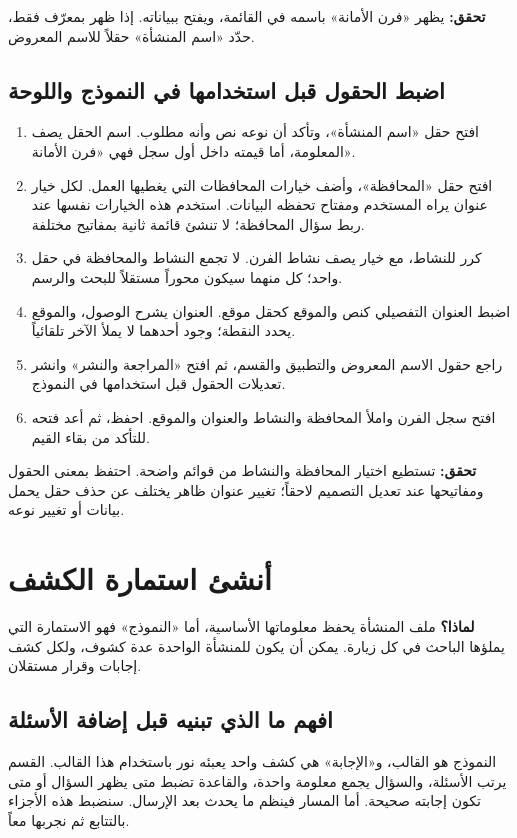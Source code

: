 \textbf{تحقق:} يظهر «فرن الأمانة» باسمه في القائمة، ويفتح ببياناته. إذا ظهر بمعرّف فقط، حدّد «اسم المنشأة» حقلاً للاسم المعروض.

\subsection{اضبط الحقول قبل استخدامها في النموذج واللوحة}

\begin{enumerate}
\item افتح حقل «اسم المنشأة»، وتأكد أن نوعه نص وأنه مطلوب. اسم الحقل يصف المعلومة، أما قيمته داخل أول سجل فهي «فرن الأمانة».
\item افتح حقل «المحافظة»، وأضف خيارات المحافظات التي يغطيها العمل. لكل خيار عنوان يراه المستخدم ومفتاح تحفظه البيانات. استخدم هذه الخيارات نفسها عند ربط سؤال المحافظة؛ لا تنشئ قائمة ثانية بمفاتيح مختلفة.
\item كرر للنشاط، مع خيار يصف نشاط الفرن. لا تجمع النشاط والمحافظة في حقل واحد؛ كل منهما سيكون محوراً مستقلاً للبحث والرسم.
\item اضبط العنوان التفصيلي كنص والموقع كحقل موقع. العنوان يشرح الوصول، والموقع يحدد النقطة؛ وجود أحدهما لا يملأ الآخر تلقائياً.
\item راجع حقول الاسم المعروض والتطبيق والقسم، ثم افتح «المراجعة والنشر» وانشر تعديلات الحقول قبل استخدامها في النموذج.
\item افتح سجل الفرن واملأ المحافظة والنشاط والعنوان والموقع. احفظ، ثم أعد فتحه للتأكد من بقاء القيم.
\end{enumerate}

\textbf{تحقق:} تستطيع اختيار المحافظة والنشاط من قوائم واضحة. احتفظ بمعنى الحقول ومفاتيحها عند تعديل التصميم لاحقاً؛ تغيير عنوان ظاهر يختلف عن حذف حقل يحمل بيانات أو تغيير نوعه.

\section{أنشئ استمارة الكشف}
\label{sec:build-form}

\textbf{لماذا؟} ملف المنشأة يحفظ معلوماتها الأساسية، أما «النموذج» فهو الاستمارة التي يملؤها الباحث في كل زيارة. يمكن أن يكون للمنشأة الواحدة عدة كشوف، ولكل كشف إجابات وقرار مستقلان.

\subsection{افهم ما الذي تبنيه قبل إضافة الأسئلة}

النموذج هو القالب، و«الإجابة» هي كشف واحد يعبئه نور باستخدام هذا القالب. القسم يرتب الأسئلة، والسؤال يجمع معلومة واحدة، والقاعدة تضبط متى يظهر السؤال أو متى تكون إجابته صحيحة. أما المسار فينظم ما يحدث بعد الإرسال. سنضبط هذه الأجزاء بالتتابع ثم نجربها معاً.

